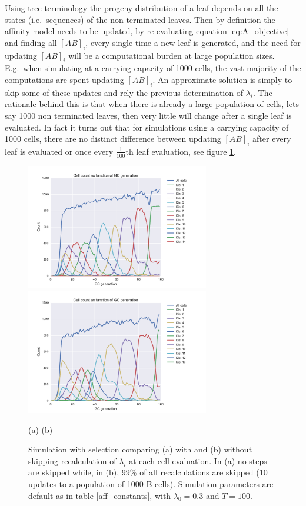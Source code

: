 Using tree terminology the progeny distribution of a leaf depends on all the states (i.e.\ sequences) of the non terminated leaves.
Then by definition the affinity model needs to be updated, by re-evaluating equation \ref{eq:A_objective} and finding all $[AB]_i$, every single time a new leaf is generated, and the need for updating $[AB]_i$ will be a computational burden at large population sizes.
E.g.\ when simulating at a carrying capacity of 1000 cells, the vast majority of the computations are spent updating $[AB]_i$.
An approximate solution is simply to skip some of these updates and rely the previous determination of $\lambda_i$.
The rationale behind this is that when there is already a large population of cells, lets say 1000 non terminated leaves, then very little will change after a single leaf is evaluated.
In fact it turns out that for simulations using a carrying capacity of 1000 cells, there are no distinct difference between updating $[AB]_i$ after every leaf is evaluated or once every $\frac{1}{100}$th leaf evaluation, see figure \ref{fig:skip_vs_no_skip_dist10}.
\begin{figure}[!ht]
\begin{center}
\includegraphics[width=80mm]{figures/sim_selection_default_run_dist10.pdf}
\hspace{-22mm}
\includegraphics[width=80mm]{figures/sim_selection_default_run_dist10_no_skip.pdf} \newline%
\end{center}
\vspace{-9mm} \hspace{34mm} (a) \hspace{53mm} (b)
    \caption{
        \label{fig:skip_vs_no_skip_dist10}
        Simulation with selection comparing (a) with and (b) without skipping recalculation of $\lambda_i$ at each cell evaluation. In (a) no steps are skipped while, in (b), 99\% of all recalculations are skipped (10 updates to a population of 1000 B cells). Simulation parameters are default as in table \ref{aff_constants}, with $\lambda_0 = 0.3$ and $T=100$.
        }
\end{figure}

